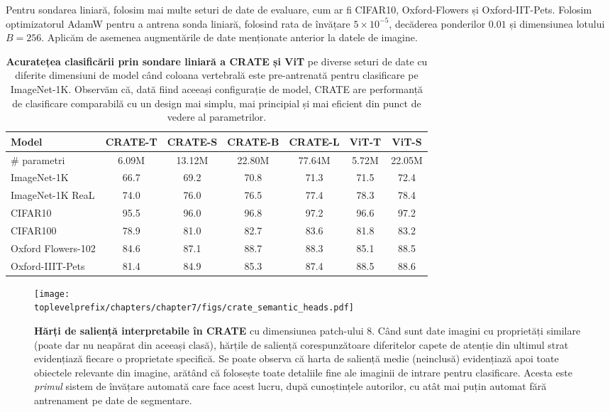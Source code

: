 \documentclass[../../book-main_ro.tex]{subfiles}
\begin{document}
Pentru sondarea liniară, folosim mai multe seturi de date de evaluare, cum ar fi CIFAR10, Oxford-Flowers și Oxford-IIT-Pets. Folosim optimizatorul AdamW pentru a antrena sonda liniară, folosind rata de învățare \(5 \times 10^{-5}\), decăderea ponderilor \(0.01\) și dimensiunea lotului \(B = 256\). Aplicăm de asemenea augmentările de date menționate anterior la datele de imagine.

\begin{table}
    \centering
    \begin{tabular}{@{}lcccc|cc@{}}
    \toprule
    \textbf{Model} & CRATE-T  &  CRATE-S & CRATE-B & CRATE-L & { \color{gray} ViT-T} &  { \color{gray}ViT-S } \\ 
    \midrule
    \midrule
     \# parametri & 6.09M & 13.12M & 22.80M & 77.64M & { \color{gray} 5.72M} & { \color{gray} 22.05M} \\
    \midrule
     ImageNet-1K & 66.7 & 69.2 & 70.8 & 71.3 & { \color{gray} 71.5} & { \color{gray} 72.4} \\
     ImageNet-1K ReaL & 74.0 & 76.0 & 76.5 & 77.4 & { \color{gray} 78.3 } & { \color{gray} 78.4} \\
     CIFAR10 & 95.5 & 96.0 & 96.8 & 97.2 & { \color{gray} 96.6} & { \color{gray} 97.2} \\
     CIFAR100 & 78.9 & 81.0 & 82.7 & 83.6 & { \color{gray} 81.8} & { \color{gray} 83.2}\\
     Oxford Flowers-102 & 84.6 & 87.1 & 88.7 & 88.3 & { \color{gray} 85.1} & { \color{gray} 88.5}\\
     Oxford-IIIT-Pets & 81.4 & 84.9 & 85.3 & 87.4 & { \color{gray} 88.5} & { \color{gray} 88.6} \\
     \bottomrule
    \end{tabular}
    \caption{\small \textbf{Acuratețea clasificării prin sondare liniară a CRATE și ViT} pe diverse seturi de date cu diferite dimensiuni de model când coloana vertebrală este pre-antrenată pentru clasificare pe ImageNet-1K. Observăm că, dată fiind aceeași configurație de model, CRATE are performanță de clasificare comparabilă cu un design mai simplu, mai principial și mai eficient din punct de vedere al parametrilor.}
    \label{tab:crate_classification_linear_probing}
\end{table}

\begin{figure}[t]
    \centering
    \texttt{[image: \\toplevelprefix/chapters/chapter7/figs/crate\_semantic\_heads.pdf]}
    \caption{\small\textbf{Hărți de saliență interpretabile în CRATE} cu dimensiunea patch-ului \(8\). Când sunt date imagini cu proprietăți similare (poate dar nu neapărat din aceeași clasă), hărțile de saliență corespunzătoare diferitelor capete de atenție din ultimul strat evidențiază fiecare o proprietate specifică. Se poate observa că harta de saliență medie (neinclusă) evidențiază apoi toate obiectele relevante din imagine, arătând că folosește toate detaliile fine ale imaginii de intrare pentru clasificare. Acesta este \textit{primul} sistem de învățare automată care face acest lucru, după cunoștințele autorilor, cu atât mai puțin automat fără antrenament pe date de segmentare.}
    \label{fig:crate_semantic_heads}
\end{figure}
\end{document}
